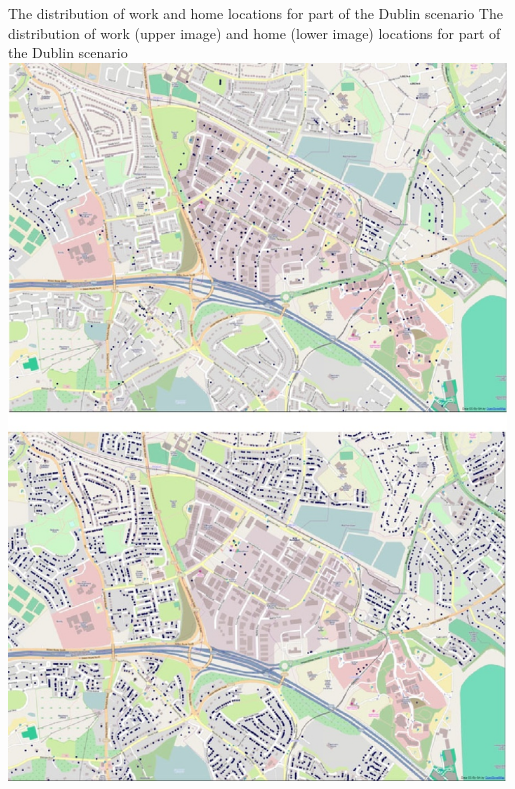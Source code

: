 \createfigure%
{The distribution of work and home locations for part of the Dublin scenario}%
{The distribution of work (upper image) and home (lower image) locations for part of the Dublin scenario}%
{\label{fig:dublin0}}%
{\includegraphics[width=0.99\textwidth, angle=0]{using/figures/dublin0.png}}%
{}

